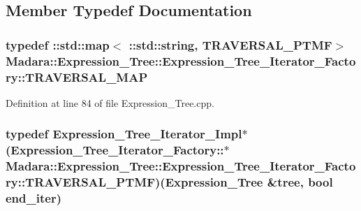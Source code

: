 \subsection{Member Typedef Documentation}
\hypertarget{classMadara_1_1Expression__Tree_1_1Expression__Tree__Iterator__Factory_aa032e0fc34454740fe22d550406e6f2b}{
\subsubsection[{TRAVERSAL\_\-MAP}]{\setlength{\rightskip}{0pt plus 5cm}typedef ::std::map$<$ ::std::string, {\bf TRAVERSAL\_\-PTMF}$>$ {\bf Madara::Expression\_\-Tree::Expression\_\-Tree\_\-Iterator\_\-Factory::TRAVERSAL\_\-MAP}}}
\label{d4/d93/classMadara_1_1Expression__Tree_1_1Expression__Tree__Iterator__Factory_aa032e0fc34454740fe22d550406e6f2b}


Definition at line 84 of file Expression\_\-Tree.cpp.

\hypertarget{classMadara_1_1Expression__Tree_1_1Expression__Tree__Iterator__Factory_a40f71753b0013655c8f227129f618ae9}{
\subsubsection[{TRAVERSAL\_\-PTMF}]{\setlength{\rightskip}{0pt plus 5cm}typedef {\bf Expression\_\-Tree\_\-Iterator\_\-Impl}$\ast$(Expression\_\-Tree\_\-Iterator\_\-Factory::$\ast$ {\bf Madara::Expression\_\-Tree::Expression\_\-Tree\_\-Iterator\_\-Factory::TRAVERSAL\_\-PTMF})({\bf Expression\_\-Tree} \&tree, bool end\_\-iter)}}
\label{d4/d93/classMadara_1_1Expression__Tree_1_1Expression__Tree__Iterator__Factory_a40f71753b0013655c8f227129f618ae9}


